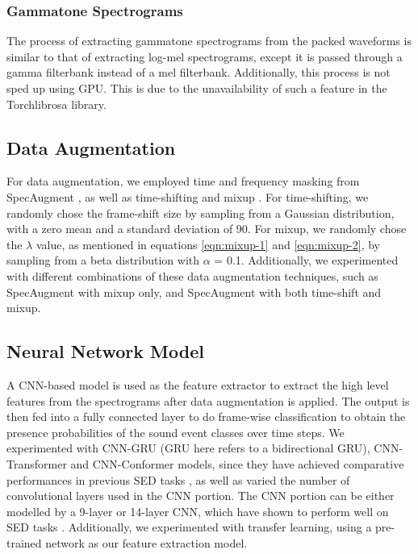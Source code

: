 \subsubsection{Gammatone Spectrograms}
The process of extracting gammatone spectrograms from the packed waveforms is similar to that of extracting log-mel spectrograms, except it is passed through a gamma filterbank instead of a mel filterbank. Additionally, this process is not sped up using GPU. This is due to the unavailability of such a feature in the Torchlibrosa library.

\subsection{Data Augmentation}
For data augmentation, we employed time and frequency masking from SpecAugment \cite{specaugment}, as well as time-shifting \cite{timeshift} and mixup \cite{mixup}. 
For time-shifting, we randomly chose the frame-shift size by sampling from a Gaussian distribution, with a zero mean and a standard deviation of 90. For mixup, we randomly chose the \(\lambda\) value, as mentioned in equations \ref{eqn:mixup-1} and \ref{eqn:mixup-2}, by sampling from a beta distribution with \(\alpha\) = 0.1. Additionally, we experimented with different combinations of these data augmentation techniques, such as SpecAugment with mixup only, and SpecAugment with both time-shift and mixup. 

\subsection{Neural Network Model}
A CNN-based model is used as the feature extractor to extract the high level features from the spectrograms after data augmentation is applied. The output is then fed into a fully connected layer to do frame-wise classification to obtain the presence probabilities of the sound event classes over time steps.  We experimented with CNN-GRU (GRU here refers to a bidirectional GRU), CNN-Transformer and CNN-Conformer models, since they have achieved comparative performances in previous SED tasks \cite{kong2020sound, xu2017convolutional, Miyazaki2020CONFORMERBASEDSE}, as well as varied the number of convolutional layers used in the CNN portion. The CNN portion can be either modelled by a 9-layer or 14-layer CNN, which have shown to perform well on SED tasks \cite{kong2020sound, torchlibrosa}. Additionally, we experimented with transfer learning, using a pre-trained network as our feature extraction model. 

